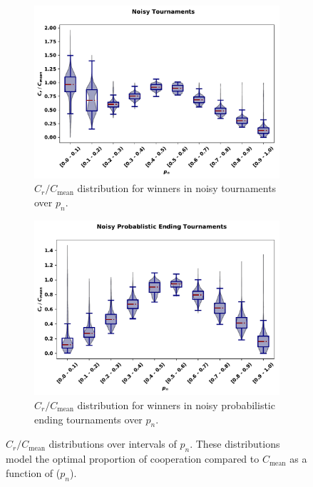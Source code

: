 \documentclass{article}
\begin{document}
\begin{figure}[!htbp]
    \centering
    \begin{subfigure}{0.485\textwidth}
        \centering
        \includegraphics[width=\textwidth]{../images/noisy_discussion_over_noise.pdf}
        \caption{\(C_r / C_{\text{mean}}\) distribution for winners in noisy tournaments over
        \(p_n\).}\label{fig:noisy_discussion_over_noise}
    \end{subfigure}
    \hfill
    \begin{subfigure}{0.485\textwidth}
        \centering
        \includegraphics[width=\textwidth]{../images/noisy_probend_discussion_over_noise.pdf}
        \caption{\(C_r / C_{\text{mean}}\) distribution for winners in noisy probabilistic ending tournaments over
        \(p_n\).}\label{fig:noisy_probend_discussion_over_noise}
    \end{subfigure}
    \caption{\(C_r / C_{\text{mean}}\) distributions over intervals of \(p_n\).
    These distributions model the optimal proportion of cooperation
    compared to \(C_{\text{mean}}\) as a function of (\(p_n\)).}
    \label{fig:compared_to_mean_over_noise_probability}
\end{figure}
\end{document}

